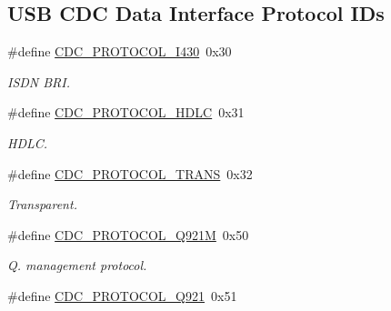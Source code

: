 \subsection*{U\-S\-B C\-D\-C Data Interface Protocol I\-Ds}
\begin{DoxyCompactItemize}
\item 
\hypertarget{group__cdc__protocol__group_ga34f6a52b0c21cc0df8558a89ab6244aa}{\#define \hyperlink{group__cdc__protocol__group_ga34f6a52b0c21cc0df8558a89ab6244aa}{C\-D\-C\-\_\-\-P\-R\-O\-T\-O\-C\-O\-L\-\_\-\-I430}~0x30}\label{group__cdc__protocol__group_ga34f6a52b0c21cc0df8558a89ab6244aa}

\begin{DoxyCompactList}\small\item\em I\-S\-D\-N B\-R\-I. \end{DoxyCompactList}\item 
\hypertarget{group__cdc__protocol__group_gaf4adc6afe3a8d15272d6063942fe1b1d}{\#define \hyperlink{group__cdc__protocol__group_gaf4adc6afe3a8d15272d6063942fe1b1d}{C\-D\-C\-\_\-\-P\-R\-O\-T\-O\-C\-O\-L\-\_\-\-H\-D\-L\-C}~0x31}\label{group__cdc__protocol__group_gaf4adc6afe3a8d15272d6063942fe1b1d}

\begin{DoxyCompactList}\small\item\em H\-D\-L\-C. \end{DoxyCompactList}\item 
\hypertarget{group__cdc__protocol__group_ga23a4cfd8c12e8d75a57bda51845abc0a}{\#define \hyperlink{group__cdc__protocol__group_ga23a4cfd8c12e8d75a57bda51845abc0a}{C\-D\-C\-\_\-\-P\-R\-O\-T\-O\-C\-O\-L\-\_\-\-T\-R\-A\-N\-S}~0x32}\label{group__cdc__protocol__group_ga23a4cfd8c12e8d75a57bda51845abc0a}

\begin{DoxyCompactList}\small\item\em Transparent. \end{DoxyCompactList}\item 
\hypertarget{group__cdc__protocol__group_ga304da80f158210479728ae1158f48498}{\#define \hyperlink{group__cdc__protocol__group_ga304da80f158210479728ae1158f48498}{C\-D\-C\-\_\-\-P\-R\-O\-T\-O\-C\-O\-L\-\_\-\-Q921\-M}~0x50}\label{group__cdc__protocol__group_ga304da80f158210479728ae1158f48498}

\begin{DoxyCompactList}\small\item\em Q. management protocol. \end{DoxyCompactList}\item 
\hypertarget{group__cdc__protocol__group_gab4efd3c7d98b5d12bf01238259a50707}{\#define \hyperlink{group__cdc__protocol__group_gab4efd3c7d98b5d12bf01238259a50707}{C\-D\-C\-\_\-\-P\-R\-O\-T\-O\-C\-O\-L\-\_\-\-Q921}~0x51}\label{group__cdc__protocol__group_gab4efd3c7d98b5d12bf01238259a50707}


\end{DoxyCompactItemize}
